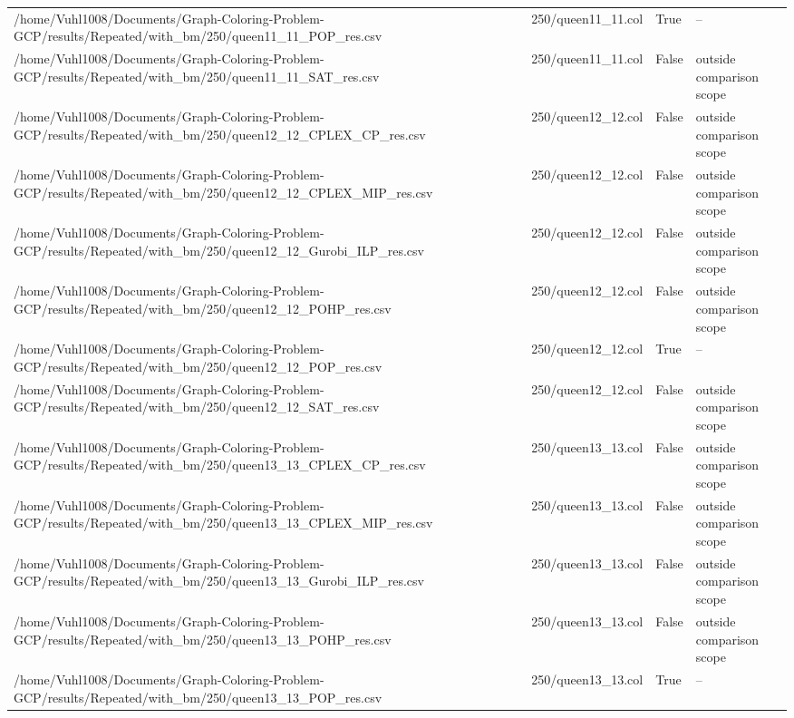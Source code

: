\begin{table}[htbp]
\begin{tabular}{llll}
/home/Vuhl1008/Documents/Graph-Coloring-Problem-GCP/results/Repeated/with\_bm/250/queen11\_11\_POP\_res.csv & 250/queen11\_11.col & True & -- \\
/home/Vuhl1008/Documents/Graph-Coloring-Problem-GCP/results/Repeated/with\_bm/250/queen11\_11\_SAT\_res.csv & 250/queen11\_11.col & False & outside comparison scope \\
/home/Vuhl1008/Documents/Graph-Coloring-Problem-GCP/results/Repeated/with\_bm/250/queen12\_12\_CPLEX\_CP\_res.csv & 250/queen12\_12.col & False & outside comparison scope \\
/home/Vuhl1008/Documents/Graph-Coloring-Problem-GCP/results/Repeated/with\_bm/250/queen12\_12\_CPLEX\_MIP\_res.csv & 250/queen12\_12.col & False & outside comparison scope \\
/home/Vuhl1008/Documents/Graph-Coloring-Problem-GCP/results/Repeated/with\_bm/250/queen12\_12\_Gurobi\_ILP\_res.csv & 250/queen12\_12.col & False & outside comparison scope \\
/home/Vuhl1008/Documents/Graph-Coloring-Problem-GCP/results/Repeated/with\_bm/250/queen12\_12\_POHP\_res.csv & 250/queen12\_12.col & False & outside comparison scope \\
/home/Vuhl1008/Documents/Graph-Coloring-Problem-GCP/results/Repeated/with\_bm/250/queen12\_12\_POP\_res.csv & 250/queen12\_12.col & True & -- \\
/home/Vuhl1008/Documents/Graph-Coloring-Problem-GCP/results/Repeated/with\_bm/250/queen12\_12\_SAT\_res.csv & 250/queen12\_12.col & False & outside comparison scope \\
/home/Vuhl1008/Documents/Graph-Coloring-Problem-GCP/results/Repeated/with\_bm/250/queen13\_13\_CPLEX\_CP\_res.csv & 250/queen13\_13.col & False & outside comparison scope \\
/home/Vuhl1008/Documents/Graph-Coloring-Problem-GCP/results/Repeated/with\_bm/250/queen13\_13\_CPLEX\_MIP\_res.csv & 250/queen13\_13.col & False & outside comparison scope \\
/home/Vuhl1008/Documents/Graph-Coloring-Problem-GCP/results/Repeated/with\_bm/250/queen13\_13\_Gurobi\_ILP\_res.csv & 250/queen13\_13.col & False & outside comparison scope \\
/home/Vuhl1008/Documents/Graph-Coloring-Problem-GCP/results/Repeated/with\_bm/250/queen13\_13\_POHP\_res.csv & 250/queen13\_13.col & False & outside comparison scope \\
/home/Vuhl1008/Documents/Graph-Coloring-Problem-GCP/results/Repeated/with\_bm/250/queen13\_13\_POP\_res.csv & 250/queen13\_13.col & True & -- \\

\end{tabular}
\end{table}
